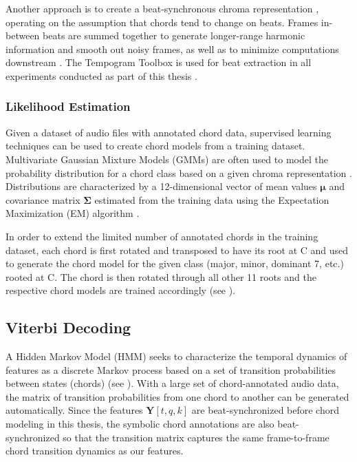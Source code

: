 Another approach is to create a beat-synchronous chroma representation \cite{bello2005robust}, operating on the assumption that chords tend to change on beats. Frames in-between beats are summed together to generate longer-range harmonic information and smooth out noisy frames, as well as to minimize computations downstream \cite{cho2014on}. The Tempogram Toolbox is used for beat extraction in all experiments conducted as part of this thesis \cite{grosche2011muller}.
 
 \subsubsection{Likelihood Estimation}

Given a dataset of audio files with annotated chord data, supervised learning techniques can be used to create chord models from a training dataset. Multivariate Gaussian Mixture Models (GMMs) are often used to model the probability distribution for a chord class based on a given chroma representation \cite{chothesis} \cite{papadopoulos2007large}. Distributions are characterized by a 12-dimensional vector of mean values $\mathbf{\mu}$ and covariance matrix $\mathbf{\Sigma}$ estimated from the training data using the Expectation Maximization (EM) algorithm \cite{sheh2003chord} \cite{moon1996expectation}.

In order to extend the limited number of annotated chords in the training dataset, each chord is first rotated and transposed to have its root at C and used to generate the chord model for the given class (major, minor, dominant 7, etc.) rooted at C. The chord is then rotated through all other 11 roots and the respective chord models are trained accordingly (see \cite{sheh2003chord}). 

\subsection{Viterbi Decoding}
\label{sec:HMM}

A Hidden Markov Model (HMM) seeks to characterize the temporal dynamics of features as a discrete Markov process based on a set of transition probabilities between states (\ie chords) (see \cite{rabiner1989tutorial}). With a large set of chord-annotated audio data, the matrix of transition probabilities from one chord to another can be generated automatically. Since the features $\mathbf{Y}[t,q,k]$ are beat-synchronized before chord modeling in this thesis, the symbolic chord annotations are also beat-synchronized so that the transition matrix captures the same frame-to-frame chord transition dynamics as our features.

